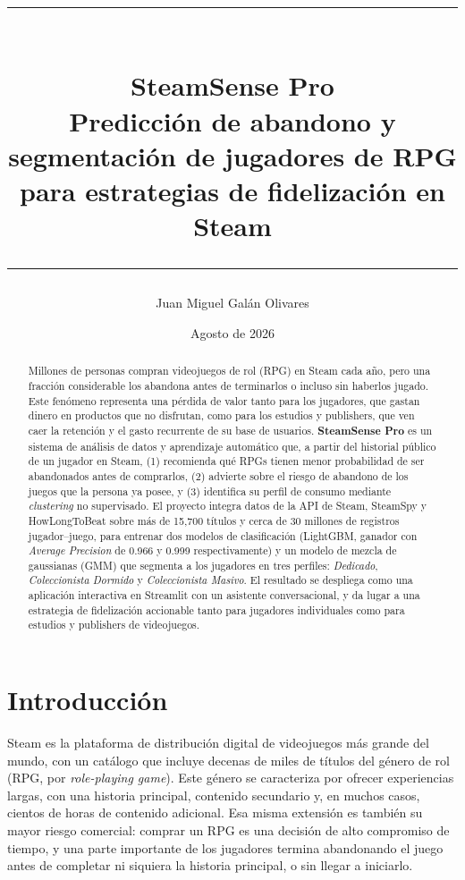 \documentclass[11pt,letterpaper]{article}
\title{
  \vspace{-1.5cm}
  {\color{sscobalt}\rule{\linewidth}{2pt}}\\[0.4cm]
  {\Huge\bfseries SteamSense Pro}\\[0.2cm]
  {\Large Predicción de abandono y segmentación de jugadores de RPG \\ para estrategias de fidelización en Steam}\\[0.3cm]
  {\color{sscobalt}\rule{\linewidth}{1pt}}
}
\author{Juan Miguel Galán Olivares}
\date{Agosto de 2026}
\begin{document}
\maketitle
\thispagestyle{empty}

\begin{abstract}
\noindent
Millones de personas compran videojuegos de rol (RPG) en Steam cada año, pero una fracción considerable los abandona antes de terminarlos o incluso sin haberlos jugado. Este fenómeno representa una pérdida de valor tanto para los jugadores, que gastan dinero en productos que no disfrutan, como para los estudios y publishers, que ven caer la retención y el gasto recurrente de su base de usuarios. \textbf{SteamSense Pro} es un sistema de análisis de datos y aprendizaje automático que, a partir del historial público de un jugador en Steam, (1) recomienda qué RPGs tienen menor probabilidad de ser abandonados antes de comprarlos, (2) advierte sobre el riesgo de abandono de los juegos que la persona ya posee, y (3) identifica su perfil de consumo mediante \textit{clustering} no supervisado. El proyecto integra datos de la API de Steam, SteamSpy y HowLongToBeat sobre más de 15{,}700 títulos y cerca de 30 millones de registros jugador--juego, para entrenar dos modelos de clasificación (LightGBM, ganador con \textit{Average Precision} de 0.966 y 0.999 respectivamente) y un modelo de mezcla de gaussianas (GMM) que segmenta a los jugadores en tres perfiles: \emph{Dedicado}, \emph{Coleccionista Dormido} y \emph{Coleccionista Masivo}. El resultado se despliega como una aplicación interactiva en Streamlit con un asistente conversacional, y da lugar a una estrategia de fidelización accionable tanto para jugadores individuales como para estudios y publishers de videojuegos.
\end{abstract}

\tableofcontents

\section{Introducción}

Steam es la plataforma de distribución digital de videojuegos más grande del mundo, con un catálogo que incluye decenas de miles de títulos del género de rol (RPG, por \textit{role-playing game}). Este género se caracteriza por ofrecer experiencias largas, con una historia principal, contenido secundario y, en muchos casos, cientos de horas de contenido adicional. Esa misma extensión es también su mayor riesgo comercial: comprar un RPG es una decisión de alto compromiso de tiempo, y una parte importante de los jugadores termina abandonando el juego antes de completar ni siquiera la historia principal, o sin llegar a iniciarlo.
\end{document}
